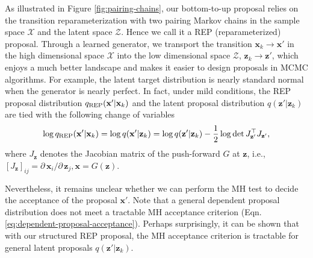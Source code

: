 \documentclass[runningheads]{llncs}
\newcommand{\bx}{\mathbf{x}}
\newcommand{\bz}{\mathbf{z}}
\newcommand{\cX}{\mathcal{X}}
\newcommand{\cZ}{\mathcal{Z}}
\newcommand{\bbR}{\mathbb{R}}
\newcommand{\<}{\left\langle}
\renewcommand{\>}{\right\rangle}
\begin{document}
As illustrated in Figure \ref{fig:pairing-chains}, our bottom-to-up proposal relies on the transition reparameterization with two pairing Markov chains in the sample space $\cX$ and the latent space $\cZ$. Hence we call it a REP (reparameterized) proposal. Through a learned generator, we transport the transition $\bx_k\to\bx'$ in the high dimensional space $\cX$ into the low dimensional space $\cZ$, $\bz_k\to\bz'$, which enjoys a much better landscape and makes it easier to design proposals in MCMC algorithms. For example, the latent target distribution is nearly standard normal when the generator is nearly perfect.
In fact, under mild conditions, the REP proposal distribution $q_{\rm REP}(\bx'|\bx_k)$ and the latent proposal distribution $q(\bz'|\bz_k)$ are tied with the following change of variables \cite{gemici2016normalizing,ben1999change}
\begin{equation}
    \log q_{\rm REP}(\bx'|\bx_k)= \log q(\bx'|\bz_k)
    =\log q(\bz'|\bz_k) - \frac{1}{2}\log\det J_{\bz'}^\top J_{\bz'},
    \label{eq:cmc-proposal-change-of-variable}
\end{equation}
where $J_\bz$ denotes the Jacobian matrix of the push-forward $G$ at $\bz$, i.e., $\left[J_\bz\right]_{ij} = \partial\,\bx_i/\partial\,\bz_j, \bx=G(\bz)$.


Nevertheless, it remains unclear whether we can perform the MH test to decide the acceptance of the proposal $\bx'$. Note that a general dependent proposal distribution does not meet a tractable MH acceptance criterion (Eqn. \eqref{eq:dependent-proposal-acceptance}). Perhaps surprisingly, 
it can be shown that with our structured REP proposal, 
the MH acceptance criterion is tractable for general latent proposals $q(\bz'|\bz_k)$. 
\end{document}
